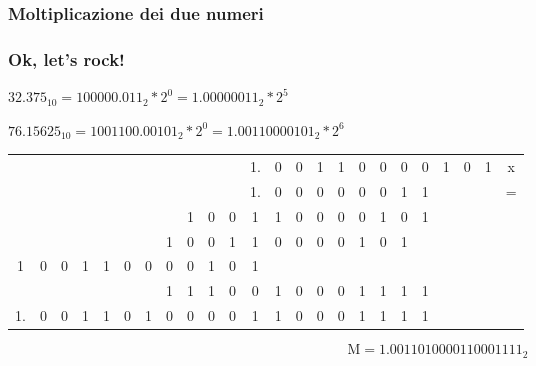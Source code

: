 \documentclass{beamer}
\begin{document}
  \subsubsection{Moltiplicazione dei due numeri}
  \begin{frame}
  		\frametitle{Ok, let's rock!}
  	
    $32.375_{10} = 100000.011_{2} * 2^{0} = 1.00000011_{2} * 2^{5}$
    
    $76.15625_{10} = 1001100.00101_{2} * 2^{0} = 1.00110000101_{2} * 2^{6}$
    	
    	\pause
    
    \vspace{1em}
		
		\setlength{\tabcolsep}{2pt}
		\begin{center}
				\begin{tabular}{ccccccccccccccccccccccc|c}
				  &   &   &   &   &   &   &   &   &   &   & 1. & 0 & 0 & 1 & 1 & 0 & 0 & 0 & 0 & 1 & 0 & 1 & x \\ 
			    &   &   &   &   &   &   &   &   &   &   & 1. & 0 & 0 & 0 & 0 & 0 & 0 & 1 & 1 &   &   &   & = \\ 
				\hline 
				  &   &   &   &   &   &   &   & 1 & 0 & 0 & 1 & 1 & 0 & 0 & 0 & 0 & 1 & 0 & 1 &   &   &   &  \\ 
				  &   &   &   &   &   &   & 1 & 0 & 0 & 1 & 1 & 0 & 0 & 0 & 0 & 1 & 0 & 1 &   &   &   &   &  \\ 
				1 & 0 & 0 & 1 & 1 & 0 & 0 & 0 & 0 & 1 & 0 & 1 &   &   &   &   &   &   &   &   &   &   &   &  \\ 
				\hline 
				  &   &   &   &   &   &   & 1 & 1 & 1 & 0 & 0 & 1 & 0 & 0 & 0 & 1 & 1 & 1 & 1 &   &   &   &  \\ 
				\hline 
				1. & 0 & 0 & 1 & 1 & 0 & 1 & 0 & 0 & 0 & 0 & 1 & 1 & 0 & 0 & 0 & 1 & 1 & 1 & 1 &   &   &   &  \\ 
				\end{tabular} 
		\end{center}
		
		\vspace{2em}
    
		$$\text{M} = 1.0011010000110001111_{2}$$
  		
  \end{frame}
\end{document}
